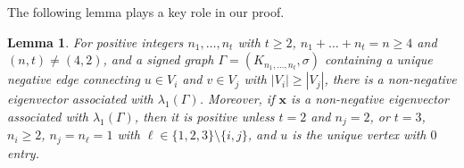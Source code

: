 \documentclass[10pt,a4paper]{amsart}
\numberwithin{equation}{section}
\newtheorem {Lemma}{Lemma}[section]
\begin{document}
%
%
The following lemma plays a key role in our proof.


\begin{Lemma}\label{nne}  For positive integers $n_1,\dots, n_t$ with 
 $t\ge 2$, $n_1+\dots+n_t=n\ge 4$ and $(n,t)\ne (4,2)$, and a signed graph $\Gamma=(K_{n_1,\dots, n_t}, \sigma)$ containing  a unique negative edge connecting  $u\in V_i$ and $v\in V_j$ with $|V_i|\ge |V_j|$,
there is a non-negative eigenvector associated with $\lambda_1(\Gamma)$. 
Moreover, if $\mathbf{x}$ is a non-negative eigenvector associated with $\lambda_1(\Gamma)$, then it is positive unless
%
%
$t=2$ and $n_j=2$, or
$t=3$, $n_i\ge 2$, $n_j=n_\ell=1$ with $\ell\in \{1,2,3\}\setminus\{i,j\}$, and $u$ is the unique vertex with $0$ entry.
\end{Lemma}
\end{document}
